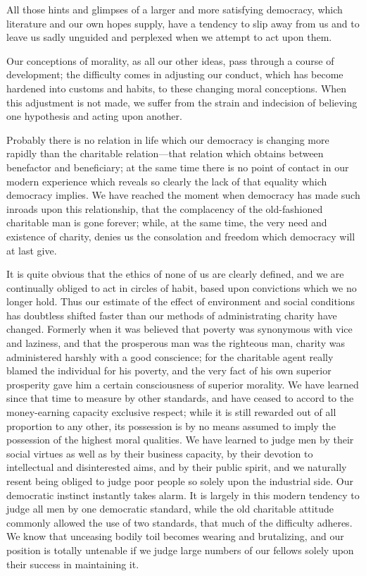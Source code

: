 \documentclass[]{article}
\begin{document}
\begin{sectionbody}

\addamsparagraph All those hints and glimpses of a larger and more satisfying democracy,
which literature and our own hopes supply, have a tendency to slip away
from us and to leave us sadly unguided and perplexed when we attempt to
act upon them.

\addamsparagraph Our conceptions of morality, as all our other ideas, pass through a
course of development; the difficulty comes in adjusting our conduct,
which has become hardened into customs and habits, to these changing
moral conceptions. When this adjustment is not made, we suffer from the
strain and indecision of believing one hypothesis and acting upon
another.

\addamsparagraph Probably there is no relation in life which our democracy is changing
more rapidly than the charitable relation---that relation which obtains
between benefactor and beneficiary; at the same time there is no point
of contact in our modern experience which reveals so clearly the lack of
that equality which democracy implies. We have reached the moment when
democracy has made such inroads upon this relationship, that the
complacency of the old-fashioned charitable man is gone forever; while,
at the same time, the very need and existence of charity, denies us the
consolation and freedom which democracy will at last give.

\addamsparagraph It is quite obvious that the ethics of none of us are clearly defined,
and we are continually obliged to act in circles of habit, based upon
convictions which we no longer hold. Thus our estimate of the effect of
environment and social conditions has doubtless shifted faster than our
methods of administrating charity have changed. Formerly when it was
believed that poverty was synonymous with vice and laziness, and that
the prosperous man was the righteous man, charity was administered
harshly with a good conscience; for the charitable agent really blamed
the individual for his poverty, and the very fact of his own superior
prosperity gave him a certain consciousness of superior morality. We
have learned since that time to measure by other standards, and have
ceased to accord to the money-earning capacity exclusive respect; while
it is still rewarded out of all proportion to any other, its possession
is by no means assumed to imply the possession of the highest moral
qualities. We have learned to judge men by their social virtues as well
as by their business capacity, by their devotion to intellectual and
disinterested aims, and by their public spirit, and we naturally resent
being obliged to judge poor people so solely upon the industrial side.
Our democratic instinct instantly takes alarm. It is largely in this
modern tendency to judge all men by one democratic standard, while the
old charitable attitude commonly allowed the use of two standards, that
much of the difficulty adheres. We know that unceasing bodily toil
becomes wearing and brutalizing, and our position is totally untenable
if we judge large numbers of our fellows solely upon their success in
maintaining it.


\end{sectionbody}
\end{document}
